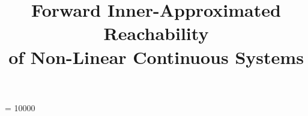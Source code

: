 \documentclass{sig-alternate-05-2015}
\def\N{{\mathbb N}}
\def\R{{\mathbb R}}
\newcommand{\vv}{{\bf v}}
\def\F{{\Bbb F}}
\def\A{{\Bbb A}}
\def\I{{\Bbb I \Bbb R}}
\def\K{{\Bbb I \Bbb K}}
\begin{document}


\widowpenalty = 10000


\def\transpose#1{{}^t \! #1}
\def\bfm#1{\protect{\makebox{\boldmath $#1$}}}
\def\a {\bfm{a}}
\def\b {\bfm{b}}
\def\c {\bfm{c}}
\def\d {\bfm{d}}
\def\e {\bfm{e}}
\def\f {\bfm{f}}
\def\g {\bfm{g}}
\def\h {\bfm{h}}
\def\ii {\bfm{i}}       %
\def\j {\bfm{j}}
\def\k {\bfm{k}}
\def\l {\bfm{l}}
\def\m {\bfm{m}}
\def\n {\bfm{n}}
\def\o {\bfm{o}}
\def\p {\bfm{p}}
\def\q {\bfm{q}}
\def\r {\bfm{r}}
\def\s {\bfm{s}}
\def\t {\bfm{t}}
\def\u {\bfm{u}}
\def\vv {\bfm{v}}       %
\def\w {\bfm{w}}
\def\x {\bfm{x}}
\def\y {\bfm{y}}
\def\z {\bfm{z}}
\def\B {\bfm{B}}
\def\C {\bfm{C}}
\def\DD{\bfm{D}}        %
\def\E {\bfm{E}}
\def\G {\bfm{G}}
\def\H {\bfm{H}}
\def\J {\bfm{J}}
\def\L {\bfm{L}}
\def\M {\bfm{M}}
\def\N {\bfm{N}}
\def\O {\bfm{O}}
\def\P {\bfm{P}}
\def\Q {\bfm{Q}}
\def\S {\bfm{S}}
\def\T {\bfm{T}}
\def\U {\bfm{U}}
\def\V {\bfm{V}}
\def\W {\bfm{W}}
\def\X {\bfm{X}}
\def\Y {\bfm{Y}}


\title{Forward Inner-Approximated Reachability \\ of Non-Linear Continuous Systems}
%
%
%
%
%
\end{document}
